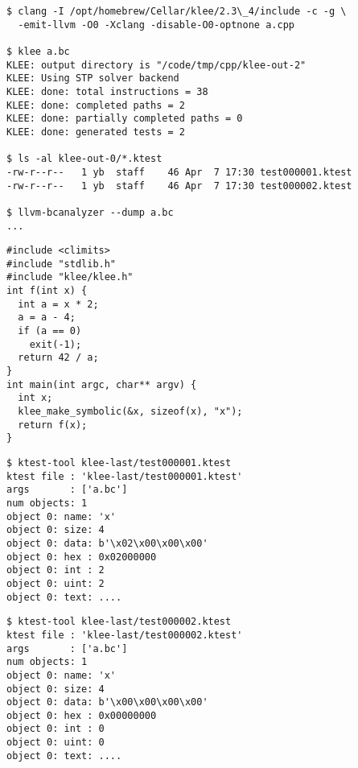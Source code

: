 \documentclass{article}
\begin{document}
{\scriptsize\begin{verbatim}
$ clang -I /opt/homebrew/Cellar/klee/2.3\_4/include -c -g \
  -emit-llvm -O0 -Xclang -disable-O0-optnone a.cpp

$ klee a.bc
KLEE: output directory is "/code/tmp/cpp/klee-out-2"
KLEE: Using STP solver backend
KLEE: done: total instructions = 38
KLEE: done: completed paths = 2
KLEE: done: partially completed paths = 0
KLEE: done: generated tests = 2

$ ls -al klee-out-0/*.ktest
-rw-r--r--   1 yb  staff    46 Apr  7 17:30 test000001.ktest
-rw-r--r--   1 yb  staff    46 Apr  7 17:30 test000002.ktest

$ llvm-bcanalyzer --dump a.bc
...
\end{verbatim}
}

\plush{}


\begin{pptWide}{3}
{\tiny\begin{verbatim}
#include <climits>
#include "stdlib.h"
#include "klee/klee.h"
int f(int x) {
  int a = x * 2;
  a = a - 4;
  if (a == 0)
    exit(-1);
  return 42 / a;
}
int main(int argc, char** argv) {
  int x;
  klee_make_symbolic(&x, sizeof(x), "x");
  return f(x);
}
\end{verbatim}
}
\par\columnbreak\par
{\tiny\begin{verbatim}
$ ktest-tool klee-last/test000001.ktest
ktest file : 'klee-last/test000001.ktest'
args       : ['a.bc']
num objects: 1
object 0: name: 'x'
object 0: size: 4
object 0: data: b'\x02\x00\x00\x00'
object 0: hex : 0x02000000
object 0: int : 2
object 0: uint: 2
object 0: text: ....
\end{verbatim}
}
\par\columnbreak\par
{\tiny\begin{verbatim}
$ ktest-tool klee-last/test000002.ktest
ktest file : 'klee-last/test000002.ktest'
args       : ['a.bc']
num objects: 1
object 0: name: 'x'
object 0: size: 4
object 0: data: b'\x00\x00\x00\x00'
object 0: hex : 0x00000000
object 0: int : 0
object 0: uint: 0
object 0: text: ....
\end{verbatim}
}
\end{pptWide}

\plush{}

\end{document}
